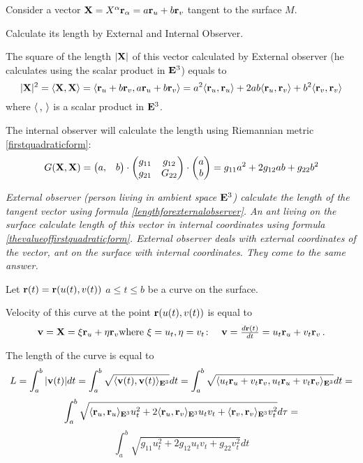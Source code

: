 \documentclass[12pt]{article}
\theoremstyle{theorem}
\numberwithin{equation}{section}
\begin{document}
  Consider a vector ${\bf X}=X^\alpha{\bf r}_\alpha=a{\bf r}_u+b{\bf r}_v$ tangent to the surface $M$.

  Calculate its length by External and Internal Observer.

  The square of the length $|{\bf X}|$ of this vector calculated by External observer
  (he calculates using the scalar product in ${\bf E}^3$) equals to
\begin{equation}\label{lengthforexternalobserver}
 |{\bf X}|^2=\langle{\bf X},{\bf X}\rangle=\langle{\bf r}_u+b{\bf r}_v,a{\bf r}_u+b{\bf r}_v\rangle=a^2\langle{\bf r}_u,{\bf r}_u\rangle+
   2ab\langle{\bf r}_u,{\bf r}_v\rangle+b^2\langle{\bf r}_v,{\bf r}_v\rangle
\end{equation}
where $\langle\,,\,\rangle$ is a scalar product in ${\bf E}^3$.

The internal observer will calculate the length using Riemannian metric \eqref{firstquadraticform}:
\begin{equation}\label{thevalueoffirstquadraticform}
  G({\bf X},{\bf X})=
  \begin{pmatrix}
   a, &b
  \end{pmatrix}
   \cdot
   \begin{pmatrix}
   g_{11} & g_{12} \\
   g_{21}& G_{22} \\
   \end{pmatrix}\cdot
  \begin{pmatrix}
   a\\ b\\
  \end{pmatrix}=
  g_{11}a^2+2g_{12}ab+g_{22}b^2
\end{equation}

{\it External observer (person living in ambient space ${\bf E}^3$) calculate the length
of the tangent vector  using formula
\eqref{lengthforexternalobserver}. An ant living on the surface
calculate length of this vector in internal coordinates using formula
\eqref{thevalueoffirstquadraticform}. External observer deals
with external coordinates of the vector, ant on the surface with internal coordinates.
 They come to the same answer.}


\smallskip



  Let ${\bf r}(t)={\bf r}(u(t),v(t))$ $a\leq t\leq b$ be a curve on the surface.


  Velocity of this curve at the  point ${\bf r}(u(t),v(t))$ is equal to
  $$
  {\bf v}={\bf X}=\xi {\bf r}_u+\eta{\bf r}_v
  \hbox
  {where
  $\xi=u_t,\eta=v_t\colon\quad {\bf v}={d{\bf r}(t)\over dt}=
    u_t{\bf r}_u+v_t{\bf r}_v$}
  \,.
  $$


The length of the curve is equal to
\begin{equation}\label{lengthofthecurveexternal}
L=\int_a^b |{\bf v}(t)|d t= \int_a^b\sqrt
{\langle {\bf v}(t),{\bf v}(t)\rangle_{{\bf E}^3}}d t = \int_a^b\sqrt
{\langle u_t{\bf r}_u+v_t{\bf r}_v,u_t{\bf r}_u+v_t{\bf r}_v\rangle_{{\bf E}^3}}dt=
\end{equation}
           $$
\int_a^b\sqrt {\langle{\bf r}_u,{\bf r}_u\rangle_{{\bf E}^3}u_t^2+2\langle{\bf r}_u,{\bf r}_v\rangle_{{\bf E}^3}u_tv_t+\langle{\bf r}_v,{\bf r}_v\rangle_{{\bf E}^3}v_t^2}d\tau=
           $$
\begin{equation}\label{lengthofthecurveinternal}
  \int_a^b\sqrt {g_{11} u_t^2+2g_{12}u_tv_t+g_{22}v_t^2}dt
\end{equation}
\end{document}
